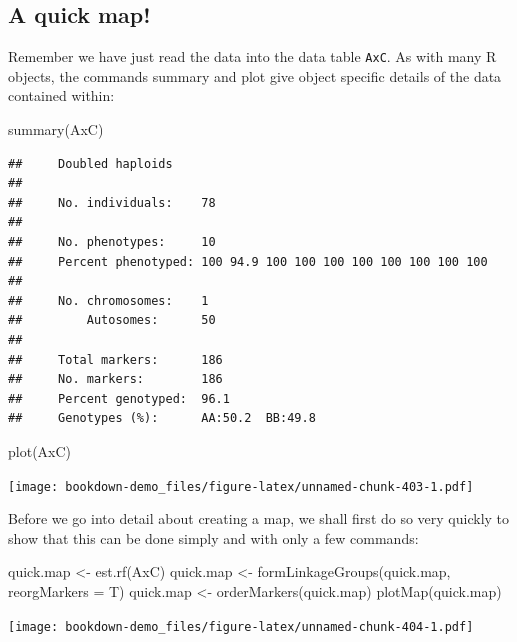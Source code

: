 \documentclass[
]{book}
\newenvironment{Shaded}{\begin{snugshade}}{\end{snugshade}}
\newcommand{\AttributeTok}[1]{\textcolor[rgb]{0.77,0.63,0.00}{#1}}
\newcommand{\FunctionTok}[1]{\textcolor[rgb]{0.00,0.00,0.00}{#1}}
\newcommand{\NormalTok}[1]{#1}
\newcommand{\OtherTok}[1]{\textcolor[rgb]{0.56,0.35,0.01}{#1}}
\begin{document}
\hypertarget{a-quick-map}{%
\subsection{A quick map!}\label{a-quick-map}}

Remember we have just read the data into the data table \texttt{AxC}. As with many R objects, the commands summary and plot give object specific details of the data contained within:

\begin{Shaded}
\begin{Highlighting}[]
\FunctionTok{summary}\NormalTok{(AxC)}
\end{Highlighting}
\end{Shaded}

\begin{verbatim}
##     Doubled haploids
## 
##     No. individuals:    78 
## 
##     No. phenotypes:     10 
##     Percent phenotyped: 100 94.9 100 100 100 100 100 100 100 100 
## 
##     No. chromosomes:    1 
##         Autosomes:      50 
## 
##     Total markers:      186 
##     No. markers:        186 
##     Percent genotyped:  96.1 
##     Genotypes (%):      AA:50.2  BB:49.8
\end{verbatim}

\begin{Shaded}
\begin{Highlighting}[]
\FunctionTok{plot}\NormalTok{(AxC)}
\end{Highlighting}
\end{Shaded}

\texttt{[image: bookdown-demo\_files/figure-latex/unnamed-chunk-403-1.pdf]}

Before we go into detail about creating a map, we shall first do so very quickly to show that this can be done simply and with only a few commands:

\begin{Shaded}
\begin{Highlighting}[]
\NormalTok{quick.map }\OtherTok{\textless{}{-}} \FunctionTok{est.rf}\NormalTok{(AxC)}
\NormalTok{quick.map }\OtherTok{\textless{}{-}} \FunctionTok{formLinkageGroups}\NormalTok{(quick.map, }\AttributeTok{reorgMarkers =}\NormalTok{ T)}
\NormalTok{quick.map }\OtherTok{\textless{}{-}} \FunctionTok{orderMarkers}\NormalTok{(quick.map)}
\FunctionTok{plotMap}\NormalTok{(quick.map)}
\end{Highlighting}
\end{Shaded}

\texttt{[image: bookdown-demo\_files/figure-latex/unnamed-chunk-404-1.pdf]}
\end{document}
